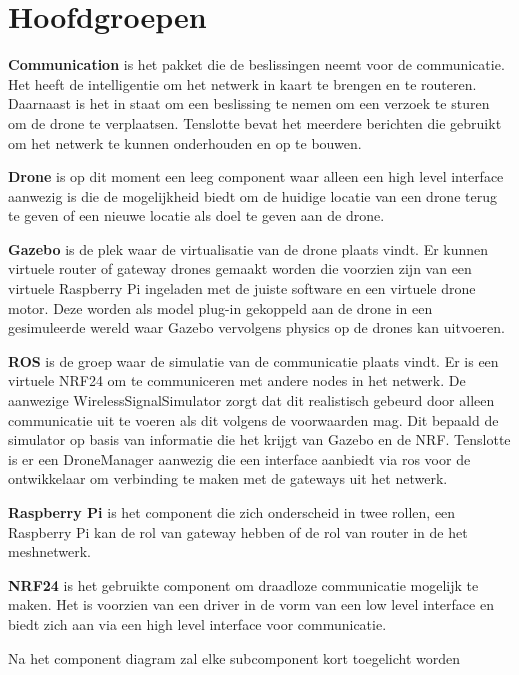 \documentclass[a4paper, 11pt, oneside]{report}
\begin{document}
\section{Hoofdgroepen}

\textbf{Communication} is het pakket die de beslissingen neemt voor de communicatie.
Het heeft de intelligentie om het netwerk in kaart te brengen en te routeren.
Daarnaast is het in staat om een beslissing te nemen om een verzoek te sturen om de drone te verplaatsen.
Tenslotte bevat het meerdere berichten die gebruikt om het netwerk te kunnen onderhouden en op te bouwen.    

\textbf{Drone} is op dit moment een leeg component waar alleen een high level interface aanwezig is die de mogelijkheid biedt om de huidige locatie van een drone terug te geven of een nieuwe locatie als doel te geven aan de drone. 

\textbf{Gazebo} is de plek waar de virtualisatie van de drone plaats vindt.
Er kunnen virtuele router of gateway drones gemaakt worden die voorzien zijn van een virtuele Raspberry Pi ingeladen met de juiste software en een virtuele drone motor.
Deze worden als model plug-in gekoppeld aan de drone in een gesimuleerde wereld waar Gazebo vervolgens physics op de drones kan uitvoeren. 

\textbf{ROS} is de groep waar de simulatie van de communicatie plaats vindt.
Er is een virtuele NRF24 om te communiceren met andere nodes in het netwerk.
De aanwezige WirelessSignalSimulator zorgt dat dit realistisch gebeurd door alleen communicatie uit te voeren als dit volgens de voorwaarden mag.
Dit bepaald de simulator op basis van informatie die het krijgt van Gazebo en de NRF.
Tenslotte is er een DroneManager aanwezig die een interface aanbiedt via ros voor de ontwikkelaar om verbinding te maken met de gateways uit het netwerk.

\textbf{Raspberry Pi} is het component die zich onderscheid in twee rollen, een Raspberry Pi kan de rol van gateway hebben of de rol van router in de het meshnetwerk.

\textbf{NRF24} is het gebruikte component om draadloze communicatie mogelijk te maken. Het is voorzien van een driver in de vorm van een low level interface en biedt zich aan via een high level interface voor communicatie.

Na het component diagram zal elke subcomponent kort toegelicht worden
\end{document}
